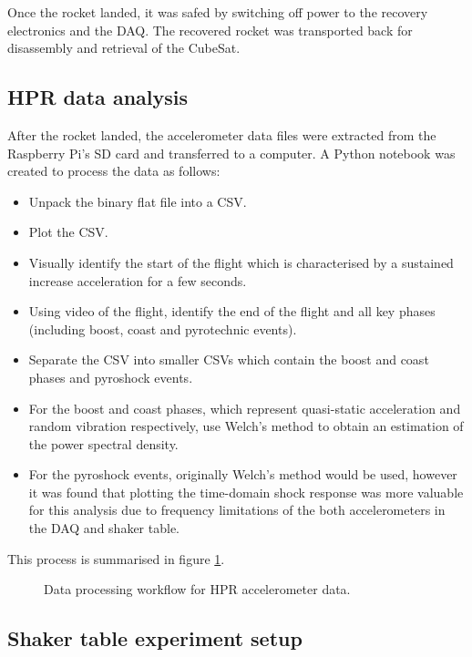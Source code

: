 \documentclass[]{report}
\begin{document}
Once the rocket landed, it was safed by switching off power to the recovery electronics and the DAQ. The recovered rocket was transported back for disassembly and retrieval of the CubeSat.

\subsection{HPR data analysis}

After the rocket landed, the accelerometer data files were extracted from the Raspberry Pi's SD card and transferred to a computer. A Python notebook was created to process the data as follows:

\begin{itemize}
  \item Unpack the binary flat file into a CSV.
  \item Plot the CSV.
  \item Visually identify the start of the flight which is characterised by a sustained increase acceleration for a few seconds.
  \item Using video of the flight, identify the end of the flight and all key phases (including boost, coast and pyrotechnic events).
  \item Separate the CSV into smaller CSVs which contain the boost and coast phases and pyroshock events.
  \item For the boost and coast phases, which represent quasi-static acceleration and random vibration respectively, use Welch's method to obtain an estimation of the power spectral density.
  \item For the pyroshock events, originally Welch's method would be used, however it was found that plotting the time-domain shock response was more valuable for this analysis due to frequency limitations of the both accelerometers in the DAQ and shaker table.
\end{itemize}

This process is summarised in figure \ref{fig:hpr-data-processing}.

\begin{figure}[H]
  \centering
  
  \caption{Data processing workflow for HPR accelerometer data.}
  \label{fig:hpr-data-processing}
\end{figure}

\subsection{Shaker table experiment setup}
\end{document}
